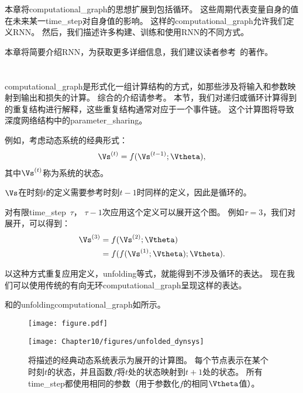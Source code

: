 本章将\gls{computational_graph}的思想扩展到包括循环。
这些周期代表变量自身的值在未来某一\gls{time_step}对自身值的影响。
这样的\gls{computational_graph}允许我们定义\gls{RNN}。
然后，我们描述许多构建、训练和使用\gls{RNN}的不同方式。

本章将简要介绍\gls{RNN}，为获取更多详细信息，我们建议读者参考~\cite{Graves-book2012}的著作。


\section{}
\label{sec:unfolding_computational_graphs}
\gls{computational_graph}是形式化一组计算结构的方式，如那些涉及将输入和参数映射到输出和损失的计算。
综合的介绍请参考。
本节，我们对递归或循环计算得到的重复结构进行解释，这些重复结构通常对应于一个事件链。
这个计算图将导致深度网络结构中的\gls{parameter_sharing}。

例如，考虑动态系统的经典形式：
\begin{align}
\label{eq:101s}
\Vs^{(t)} = f(\Vs^{(t-1)}; \Vtheta),
\end{align}
其中$ \Vs^{(t)}$称为系统的状态。

$\Vs$在时刻$t$的定义需要参考时刻$t-1$时同样的定义，因此是循环的。

对有限\gls{time_step}~$\tau$， $\tau-1$次应用这个定义可以展开这个图。
例如$\tau = 3$，我们对展开，可以得到：
\begin{align}
 \Vs^{(3)} &= f(\Vs^{(2)}; \Vtheta) \\
 & = f(f(\Vs^{(1)}; \Vtheta) ; \Vtheta).
  \label{eq:103s}
\end{align}

以这种方式重复应用定义，\gls{unfolding}等式，就能得到不涉及循环的表达。
现在我们可以使用传统的有向无环\gls{computational_graph}呈现这样的表达。

和的\gls{unfolding}\gls{computational_graph}如所示。
\begin{figure}[!htb]
\ifOpenSource
\centerline{\texttt{[image: figure.pdf]}}
\else
\centerline{\texttt{[image: Chapter10/figures/unfolded\_dynsys]}}
\fi
\caption{将描述的经典动态系统表示为展开的计算图。
每个节点表示在某个时刻$t$的状态，并且函数$f$将$t$处的状态映射到$t+1$处的状态。
所有\gls{time_step}都使用相同的参数（用于参数化$f$的相同$\Vtheta$值）。
}
\label{fig:chap10_unfolded_dynsys}
\end{figure}

